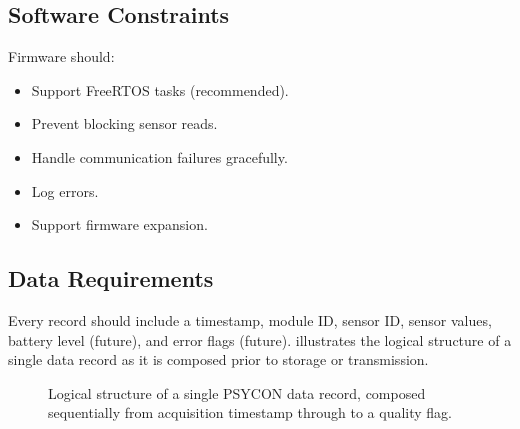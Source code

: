 \subsection{Software Constraints}
\label{sec:software-constraints}

Firmware should:
\begin{itemize}
    \item Support FreeRTOS tasks (recommended).
    \item Prevent blocking sensor reads.
    \item Handle communication failures gracefully.
    \item Log errors.
    \item Support firmware expansion.
\end{itemize}

\subsection{Data Requirements}
\label{sec:data-requirements}

Every record should include a timestamp, module ID, sensor ID, sensor values, battery level (future), and error flags (future).  illustrates the logical structure of a single data record as it is composed prior to storage or transmission.

\begin{figure}[H]
\centering
{}
\caption{Logical structure of a single PSYCON data record, composed sequentially from acquisition timestamp through to a quality flag.}
\label{fig:data-record-flow}
\end{figure}

